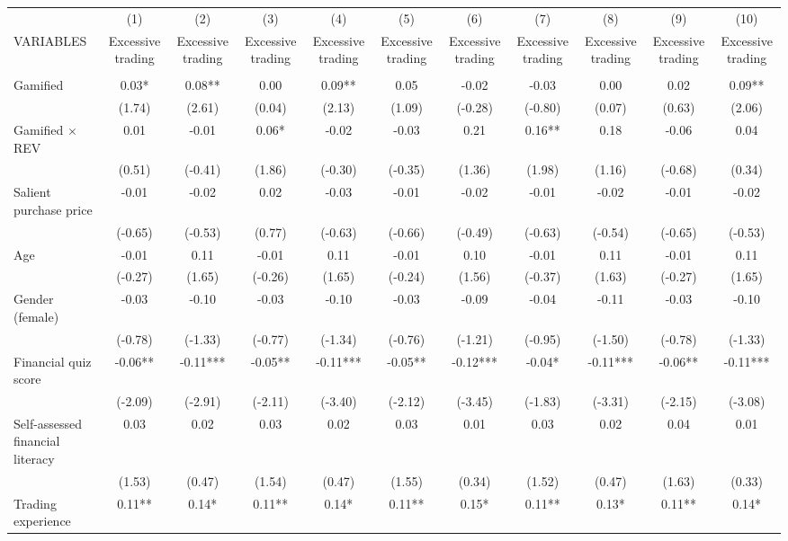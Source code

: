 \documentclass[]{article}
\begin{document}
\begin{tabular}{lcccccccccc} \hline
 & (1) & (2) & (3) & (4) & (5) & (6) & (7) & (8) & (9) & (10) \\
VARIABLES & Excessive trading & Excessive trading & Excessive trading & Excessive trading & Excessive trading & Excessive trading & Excessive trading & Excessive trading & Excessive trading & Excessive trading \\ \hline
 &  &  &  &  &  &  &  &  &  &  \\
Gamified & 0.03* & 0.08** & 0.00 & 0.09** & 0.05 & -0.02 & -0.03 & 0.00 & 0.02 & 0.09** \\
 & (1.74) & (2.61) & (0.04) & (2.13) & (1.09) & (-0.28) & (-0.80) & (0.07) & (0.63) & (2.06) \\
Gamified $\times$ REV & 0.01 & -0.01 & 0.06* & -0.02 & -0.03 & 0.21 & 0.16** & 0.18 & -0.06 & 0.04 \\
 & (0.51) & (-0.41) & (1.86) & (-0.30) & (-0.35) & (1.36) & (1.98) & (1.16) & (-0.68) & (0.34) \\
Salient purchase price & -0.01 & -0.02 & 0.02 & -0.03 & -0.01 & -0.02 & -0.01 & -0.02 & -0.01 & -0.02 \\
 & (-0.65) & (-0.53) & (0.77) & (-0.63) & (-0.66) & (-0.49) & (-0.63) & (-0.54) & (-0.65) & (-0.53) \\
Age & -0.01 & 0.11 & -0.01 & 0.11 & -0.01 & 0.10 & -0.01 & 0.11 & -0.01 & 0.11 \\
 & (-0.27) & (1.65) & (-0.26) & (1.65) & (-0.24) & (1.56) & (-0.37) & (1.63) & (-0.27) & (1.65) \\
Gender (female) & -0.03 & -0.10 & -0.03 & -0.10 & -0.03 & -0.09 & -0.04 & -0.11 & -0.03 & -0.10 \\
 & (-0.78) & (-1.33) & (-0.77) & (-1.34) & (-0.76) & (-1.21) & (-0.95) & (-1.50) & (-0.78) & (-1.33) \\
Financial quiz score & -0.06** & -0.11*** & -0.05** & -0.11*** & -0.05** & -0.12*** & -0.04* & -0.11*** & -0.06** & -0.11*** \\
 & (-2.09) & (-2.91) & (-2.11) & (-3.40) & (-2.12) & (-3.45) & (-1.83) & (-3.31) & (-2.15) & (-3.08) \\
Self-assessed financial literacy & 0.03 & 0.02 & 0.03 & 0.02 & 0.03 & 0.01 & 0.03 & 0.02 & 0.04 & 0.01 \\
 & (1.53) & (0.47) & (1.54) & (0.47) & (1.55) & (0.34) & (1.52) & (0.47) & (1.63) & (0.33) \\
Trading experience & 0.11** & 0.14* & 0.11** & 0.14* & 0.11** & 0.15* & 0.11** & 0.13* & 0.11** & 0.14* \\

\end{tabular}
\end{document}
